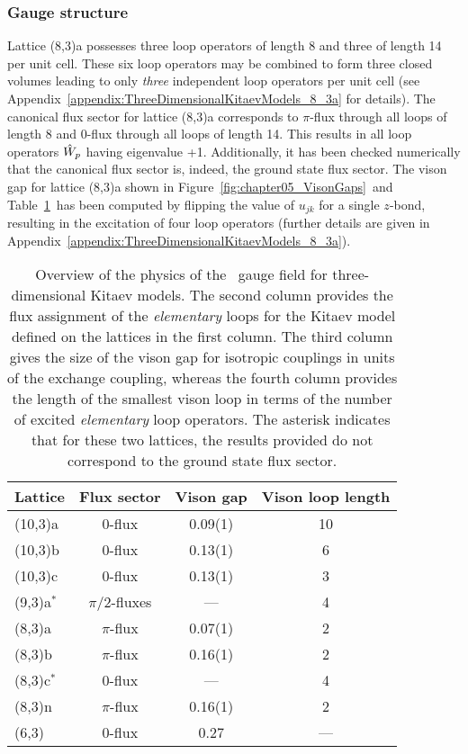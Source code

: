 \subsubsection{Gauge structure}
%
%
Lattice (8,3)a possesses three loop operators of length 8 and three of length 14 per unit cell.
These six loop operators may be combined to form three closed volumes leading to only \textit{three} independent loop operators per unit cell (see Appendix~\ref{appendix:ThreeDimensionalKitaevModels_8_3a} for details).
The canonical flux sector for lattice (8,3)a corresponds to $\pi$-flux through all loops of length 8 and $0$-flux through all loops of length 14.
This results in all loop operators $\hat{W}_p$ having eigenvalue +1.
Additionally, it has been checked numerically that the canonical flux sector is, indeed, the ground state flux sector.
The vison gap for lattice (8,3)a shown in Figure~\ref{fig:chapter05_VisonGaps}~and Table~\ref{table:chapter05_VisonGaps}~has been computed by flipping the value of $u_{jk}$ for a single $z$-bond, resulting in the excitation of four loop operators (further details are given in Appendix~\ref{appendix:ThreeDimensionalKitaevModels_8_3a}).
%
\begin{table}[tb]
	\centering
	\begin{tabular*}{\linewidth}{l|@{\extracolsep{\fill}}ccc}
		Lattice     & Flux sector    & Vison gap & Vison loop length \\
		\hline\hline
		(10,3)a     & $0$-flux       & 0.09(1)   & 10                \\
		(10,3)b     & $0$-flux       & 0.13(1)   & 6                 \\
		(10,3)c     & $0$-flux       & 0.13(1)   & 3                 \\
		\hline
		(9,3)a$^*$  & $\pi/2$-fluxes & ---       & 4                 \\
		\hline
		(8,3)a      & $\pi$-flux     & 0.07(1)   & 2                 \\
		(8,3)b      & $\pi$-flux     & 0.16(1)   & 2                 \\
		(8,3)c$^*$  & $0$-flux       & ---       & 4                 \\
		(8,3)n      & $\pi$-flux     & 0.16(1)   & 2                 \\
		\hline
		(6,3)       & $0$-flux       & 0.27      & ---                
	\end{tabular*}
	\caption{
		Overview of the physics of the \ZZ~gauge field for three-dimensional Kitaev models.
		The second column provides the flux assignment of the \textit{elementary} loops for the Kitaev model defined on the lattices in the first column.
		The third column gives the size of the vison gap for isotropic couplings in units of the exchange coupling, whereas the fourth column provides the length of the smallest vison loop in terms of the number of excited \textit{elementary} loop operators.
		The asterisk indicates that for these two lattices, the results provided do not correspond to the ground state flux sector.
	}
	\label{table:chapter05_VisonGaps}
\end{table}
%


